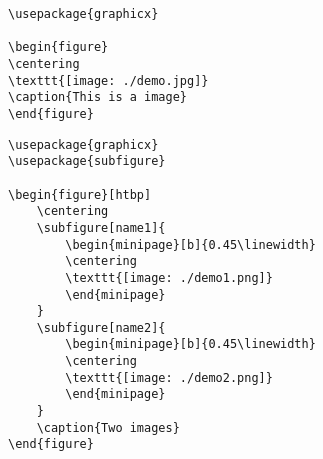\documentclass[a4paper]{ctexart}    %
\begin{document}
\begin{tcolorbox}[
         colback=red!5!white,
         colframe=teal,
         title=\textbf{graphicx input a image}
    ]
\begin{verbatim}
\usepackage{graphicx}

\begin{figure}
\centering
\texttt{[image: ./demo.jpg]}
\caption{This is a image}
\end{figure}
\end{verbatim}
\end{tcolorbox}

\begin{tcolorbox}[
         colback=red!5!white,
         colframe=teal,
         title=\textbf{graphicx input images}
    ]
\begin{verbatim}
\usepackage{graphicx}
\usepackage{subfigure}

\begin{figure}[htbp]
    \centering
    \subfigure[name1]{
        \begin{minipage}[b]{0.45\linewidth}
        \centering
        \texttt{[image: ./demo1.png]}
        \end{minipage}
    }
    \subfigure[name2]{
        \begin{minipage}[b]{0.45\linewidth}
        \centering
        \texttt{[image: ./demo2.png]}
        \end{minipage}
    }
    \caption{Two images}
\end{figure}

\end{verbatim}
\end{tcolorbox}
\end{document}
